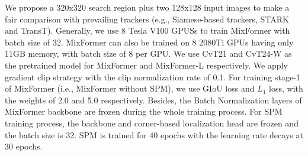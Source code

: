 We propose a 320x320 search region plus two 128x128 input images to make a fair comparison with prevailing trackers (e.g., Siamese-based trackers, STARK and TransT). Generally, we use 8 Tesla V100 GPUSs to train MixFormer with batch size of 32. MixFormer can also be trained on 8 2080Ti GPUs having only 11GB memory, with batch size of 8 per GPU. We use CvT21 and CvT24-W as the pretrained model for MixFormer and MixFormer-L respectively. We apply gradient clip strategy with the clip normalization rate of 0.1. For training stage-1 of MixFormer (i.e., MixFormer without SPM), we use GIoU loss and $L_1$ loss, with the weights of 2.0 and 5.0 respectively. Besides, the Batch Normalization layers of MixFormer backbone are frozen during the whole training process. For SPM training process, the backbone and corner-based localization head are frozen and the batch size is 32. SPM is trained for 40 epochs with the learning rate decays at 30 epochs.

{\small
}

